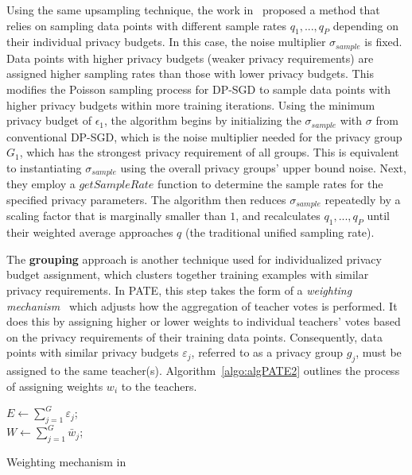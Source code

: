 Using the same upsampling technique, the work in~\cite{haveit} proposed a method that relies on sampling data points with different sample rates ${q_1, . . . , q_P }$ depending on their individual privacy budgets. In this case, the noise multiplier $\sigma_{sample}$ is fixed. Data points with higher privacy budgets (weaker privacy requirements) are assigned higher sampling rates than those with lower privacy budgets. This modifies the Poisson sampling process for DP-SGD to sample data points with higher privacy budgets within more training iterations.
Using the minimum privacy budget of $\epsilon_1$, the algorithm begins by initializing the $\sigma_{sample}$ with $\sigma$ from conventional DP-SGD, which is the noise multiplier needed for the privacy group $G_1$, which has the strongest privacy requirement of all groups. This is equivalent to instantiating $\sigma_{sample}$ using the overall privacy groups' upper bound noise. Next, they employ a $getSampleRate$ function to determine the sample rates for the specified privacy parameters. The algorithm then reduces $\sigma_{sample}$ repeatedly by a scaling factor that is marginally smaller than $1$, and  recalculates ${q_1,...,q_P}$ until their weighted average approaches $q$ (the traditional unified sampling rate).

The \textbf{grouping} approach is another technique used for individualized privacy budget assignment, which clusters together training examples with similar privacy requirements. In PATE, this step takes the form of a {\em weighting mechanism}~\cite{ipate} which adjusts how the aggregation of teacher votes is performed. It does this by assigning higher or lower weights to individual teachers' votes based on the privacy requirements of their training data points. Consequently, data points with similar privacy budgets $\varepsilon_j$, referred to as a privacy group $g_j$, must be assigned to the same teacher(s). Algorithm~\ref{algo:algPATE2} outlines the process of assigning weights $w_i$ to the teachers.

\begin{algorithm}[H] 
\SetAlgoLined
{}
$E \leftarrow \sum_{j=1}^{G} \varepsilon_j$; \\
$W \leftarrow \sum_{j=1}^{G} \bar{w}_j$; \\
\caption{Weighting mechanism in~\cite{ipate}}
\label{algo:algPATE2}
\end{algorithm}

